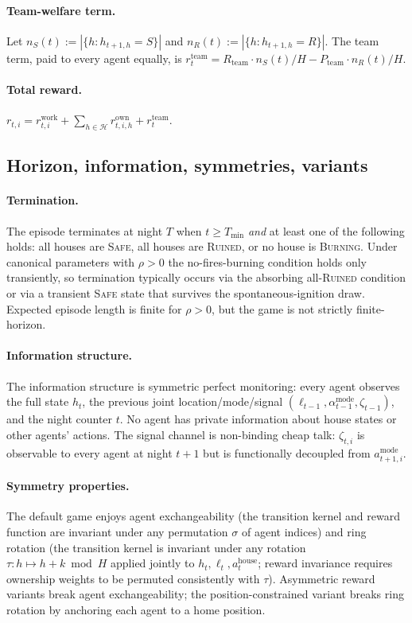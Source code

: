 \documentclass{anvil-paper}
\begin{document}
\paragraph{Team-welfare term.}
Let $n_S(t):=|\{h:h_{t+1,h}=S\}|$ and $n_R(t):=|\{h:h_{t+1,h}=R\}|$.
The team term, paid to every agent equally, is
$r_t^{\text{team}}=R_{\text{team}}\cdot n_S(t)/H
                  -P_{\text{team}}\cdot n_R(t)/H$.

\paragraph{Total reward.}
$r_{t,i} = r_{t,i}^{\text{work}}
         + \sum_{h\in\mathcal{H}} r_{t,i,h}^{\text{own}}
         + r_t^{\text{team}}$.

\subsection{Horizon, information, symmetries, variants}
\label{app:envspec:variants}

\paragraph{Termination.}
The episode terminates at night $T$ when $t\geq T_{\min}$ \emph{and} at
least one of the following holds: all houses are \textsc{Safe}, all
houses are \textsc{Ruined}, or no house is \textsc{Burning}. Under
canonical parameters with $\rho>0$ the no-fires-burning condition holds
only transiently, so termination typically occurs via the absorbing
all-\textsc{Ruined} condition or via a transient \textsc{Safe} state that
survives the spontaneous-ignition draw. Expected episode length is
finite for $\rho>0$, but the game is not strictly finite-horizon.

\paragraph{Information structure.}
The information structure is symmetric perfect monitoring: every agent
observes the full state $h_t$, the previous joint
location/mode/signal $(\ell_{t-1},\alpha_{t-1}^{\text{mode}},
\zeta_{t-1})$, and the night counter $t$. No agent has private
information about house states or other agents' actions. The signal
channel is non-binding cheap talk: $\zeta_{t,i}$ is observable to every
agent at night $t{+}1$ but is functionally decoupled from
$a_{t+1,i}^{\text{mode}}$.

\paragraph{Symmetry properties.}
The default game enjoys agent exchangeability (the transition kernel and
reward function are invariant under any permutation $\sigma$ of agent
indices) and ring rotation (the transition kernel is invariant under any
rotation $\tau:h\mapsto h+k\bmod H$ applied jointly to $h_t,\ell_t,
a_t^{\text{house}}$; reward invariance requires ownership weights to be
permuted consistently with $\tau$). Asymmetric reward variants break
agent exchangeability; the position-constrained variant breaks ring
rotation by anchoring each agent to a home position.
\end{document}
